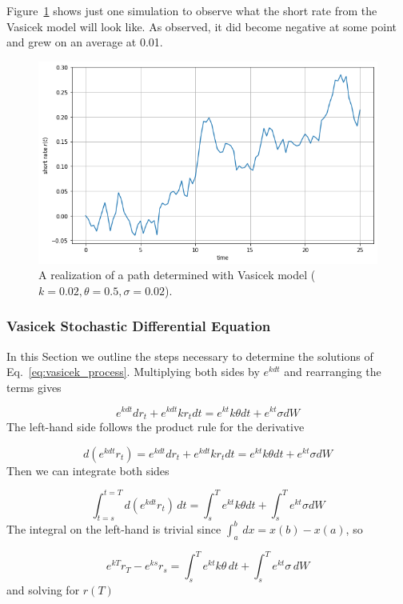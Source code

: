 Figure~\ref{fig:vasicek_path} shows just one simulation to observe what the short rate from the Vasicek model will look like. 
As observed, it did become negative at some point and grew on an average at 0.01.

\begin{figure}[htb]
	\centering
	\includegraphics[width=0.7\linewidth]{figures/vasicek_short_rate}
	\caption{A realization of a path determined with Vasicek model ($k=0.02, \theta=0.5, \sigma=0.02$).}
	\label{fig:vasicek_path}
\end{figure}

\subsubsection{Vasicek Stochastic Differential Equation}
\label{vasicek-stochastic-differential-equation}

In this Section we outline the steps necessary to determine the solutions 
of Eq.~\ref{eq:vasicek_process}.
Multiplying both sides by \(e^{kdt}\) and rearranging the terms gives

\begin{equation*}
	e^{kdt}dr_t + e^{kdt}kr_t dt = e^{kt}k\theta dt + e^{kt}\sigma dW
\end{equation*}
The left-hand side follows the product rule for the derivative

\begin{equation*}
	d(e^{kdt}r_t) = e^{kdt}dr_t + e^{kdt}kr_t dt= e^{kt}k\theta dt + e^{kt}\sigma dW
\end{equation*}
Then we can integrate both sides

\begin{equation*}
	\int^{t=T}_{t=s} d(e^{kdt}r_t)\,dt = \int^T_s e^{kt}k\theta dt +\int^T_s e^{kt}\sigma dW
\end{equation*}
The integral on the left-hand is trivial since \(\int^b_a\,dx = x(b)-x(a)\), so

\begin{equation*}
	e^{kT}r_T - e^{ks}r_s = \int^T_s e^{kt}k\theta\,dt +\int^T_s e^{kt}\sigma\,dW
\end{equation*}
and solving for \(r(T)\)

